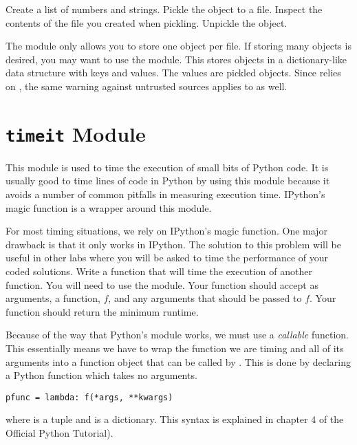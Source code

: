 \begin{problem}
Create a list of numbers and strings.
Pickle the object to a file.
Inspect the contents of the file you created when pickling.
Unpickle the object.
\end{problem}

The  module only allows you to store one object per file.
If storing many objects is desired, you may want to use the  module.
This stores objects in a dictionary-like data structure with keys and values.
The values are pickled objects.
Since  relies on , the same warning against untrusted sources applies to  as well.

\section*{\texttt{timeit} Module}
This module is used to time the execution of small bits of Python code.
It is usually good to time lines of code in Python by using this module because it avoids a number of common pitfalls in measuring execution time.
IPython's  magic function is a wrapper around this module.

\begin{problem}
For most timing situations, we rely on IPython's  magic function.
One major drawback is that it only works in IPython.
The solution to this problem will be useful in other labs where you will be asked to time the performance of your coded solutions.
Write a function that will time the execution of another function.
You will need to use the  module.
Your function should accept as arguments, a function, $f$, and any arguments that should be passed to $f$.
Your function should return the minimum runtime.

Because of the way that Python's  module works, we must use a \emph{callable} function.
This essentially means we have to wrap the function we are timing and all of its arguments into a function object that can be called by .
This is done by declaring a Python  function which takes no arguments.
\begin{lstlisting}
pfunc = lambda: f(*args, **kwargs)
\end{lstlisting}
where  is a tuple and  is a dictionary.
This syntax is explained in chapter 4 of the Official Python Tutorial).
\end{problem}


